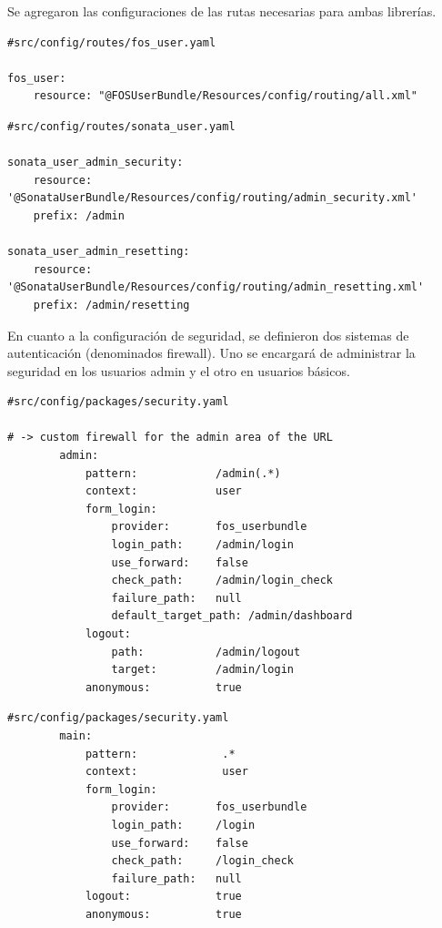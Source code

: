 

Se agregaron las configuraciones de las rutas necesarias para ambas librerías.



\begin{lstlisting}[caption=archivo de configuración de rutas de FOSUser]
#src/config/routes/fos_user.yaml

fos_user:
    resource: "@FOSUserBundle/Resources/config/routing/all.xml"
\end{lstlisting}

\begin{lstlisting}[caption=archivo de configuración de rutas de sonata-user]
#src/config/routes/sonata_user.yaml

sonata_user_admin_security:
    resource: '@SonataUserBundle/Resources/config/routing/admin_security.xml'
    prefix: /admin

sonata_user_admin_resetting:
    resource: '@SonataUserBundle/Resources/config/routing/admin_resetting.xml'
    prefix: /admin/resetting

\end{lstlisting}


En cuanto a la configuración de seguridad, se definieron dos sistemas de autenticación (denominados firewall)\@. Uno se encargará de administrar la seguridad en
los usuarios admin y el otro en usuarios básicos.

\begin{lstlisting}[caption=Firewall para el área admin del sistema.]
#src/config/packages/security.yaml

# -> custom firewall for the admin area of the URL
        admin:
            pattern:            /admin(.*)
            context:            user
            form_login:
                provider:       fos_userbundle
                login_path:     /admin/login
                use_forward:    false
                check_path:     /admin/login_check
                failure_path:   null
                default_target_path: /admin/dashboard
            logout:
                path:           /admin/logout
                target:         /admin/login
            anonymous:          true
\end{lstlisting}

\newpage
\begin{lstlisting}[caption=Firewall para el área de registro y login de usuarios básicos.]
#src/config/packages/security.yaml
        main:
            pattern:             .*
            context:             user
            form_login:
                provider:       fos_userbundle
                login_path:     /login
                use_forward:    false
                check_path:     /login_check
                failure_path:   null
            logout:             true
            anonymous:          true
\end{lstlisting}

